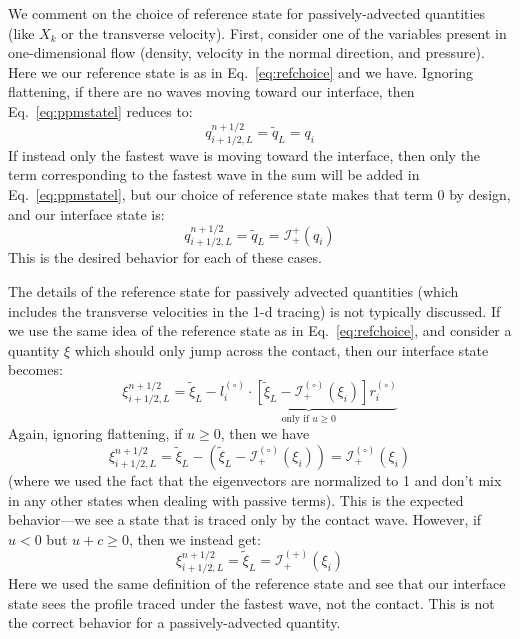 \documentclass[iop]{emulateapj}
\newcommand{\evz}{{(\circ)}}
\newcommand{\evp}{{(+)}}
\begin{document}
We comment on the choice of reference state for passively-advected
quantities (like $X_k$ or the transverse velocity).
First, consider one of the variables present in one-dimensional flow
(density, velocity in the normal direction, and pressure).  Here we
our reference state is as in Eq.~\ref{eq:refchoice} and we have.
Ignoring flattening, if there are no waves moving toward our
interface, then Eq.~\ref{eq:ppmstatel} reduces to:
\begin{equation}
q_{i+1/2,L}^{n+1/2} = \tilde{q}_L = q_i
\end{equation}
If instead only the fastest wave is moving toward the interface, then
only the term corresponding to the fastest wave in the sum will be
added in Eq.~\ref{eq:ppmstatel}, but our choice of reference state makes
that term 0 by design, and our interface state is:
\begin{equation}
q_{i+1/2,L}^{n+1/2} = \tilde{q}_L = \mathcal{I}_+^{+}(q_i)
\end{equation}
This is the desired behavior for each of these cases. 

The details of the reference state for passively advected quantities 
(which includes the transverse velocities in the 1-d tracing) is not
typically discussed.  If we use the same idea of the reference state as
in Eq.~\ref{eq:refchoice}, and consider a quantity $\xi$ which should only
jump across the contact, then our interface state becomes:
\begin{equation}
\xi_{i+1/2,L}^{n+1/2} = \tilde{\xi}_L -
  \underbrace{l_i^\evz \cdot \left [
        \tilde{\xi}_L  - \mathcal{I}^\evz_+(\xi_i)
       \right ] r_i^\evz}_{\text{only if~$u \ge 0$}}
\end{equation}
Again, ignoring flattening, if $u \ge 0$, then we have
\begin{equation}
\xi_{i+1/2,L}^{n+1/2} = \tilde{\xi}_L -
  \left (\tilde{\xi}_L  - \mathcal{I}^\evz_+(\xi_i) \right ) = \mathcal{I}^\evz_+(\xi_i)
\end{equation}
(where we used the fact that the eigenvectors are normalized to 1 and
don't mix in any other states when dealing with passive terms).  This
is the expected behavior---we see a state that is traced only by the
contact wave.  However, if $u < 0$ but $u + c \ge 0$, then we instead get:
\begin{equation}
\xi_{i+1/2,L}^{n+1/2} = \tilde{\xi}_L = \mathcal{I}^\evp_+(\xi_i)
\end{equation}
Here we used the same definition of the reference state and see that our
interface state sees the profile traced under the fastest wave, not the
contact.  This is not the correct behavior for a passively-advected
quantity.  
\end{document}

